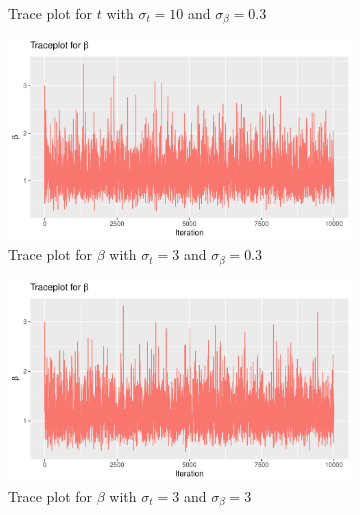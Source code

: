 \begin{figure}[H]
\begin{subfigure}[b]{0.49\textwidth}
        \caption{Trace plot for $t$ with $\sigma_t = 10$ and $\sigma_{\beta} = 0.3$}
        \label{fig:block_sim_t_sigma10}
    \end{subfigure}
    \begin{subfigure}[b]{0.49\textwidth}
        \centering
        \includegraphics[width = \textwidth]{Images/block_sim_beta.pdf}
        \caption{Trace plot for $\beta$ with $\sigma_t = 3$ and $\sigma_{\beta} = 0.3$}
        \label{fig:block_sim_beta}
    \end{subfigure}
    \begin{subfigure}[b]{0.49\textwidth}
        \centering
        \includegraphics[width = \textwidth]{Images/block_sim_beta_sigma3.pdf}
        \caption{Trace plot for $\beta$ with $\sigma_t = 3$ and $\sigma_{\beta} = 3$}
        \label{fig:block_sim_beta_sigma3}
    \end{subfigure}
    \begin{subfigure}[b]{0.49\textwidth}
        \centering

\end{subfigure}
\end{figure}
